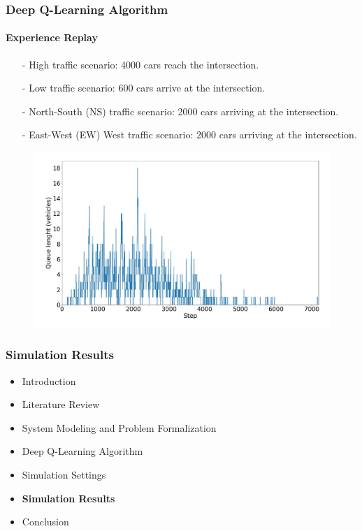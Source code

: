 \documentclass[aspectratio=169]{beamer}
\begin{document}
\begin{frame}
\frametitle{Deep Q-Learning Algorithm}
\framesubtitle{Experience Replay}
\begin{minipage}{0.4\textwidth}
\begin{enumerate}
    \item [-] High traffic scenario: 4000 cars reach the intersection.
    \item [-] Low traffic scenario: 600 cars arrive at the intersection.
    \item [-] North-South (NS) traffic scenario: 2000 cars arriving at the intersection.
    \item [-] East-West (EW) West traffic scenario: 2000 cars arriving at the intersection.
\end{enumerate}

\end{minipage}%
\hfill
\begin{minipage}{0.6\textwidth}
\begin{figure}
    \centering
    \includegraphics[width=1\linewidth]{images/weibull.pdf} 
\end{figure}
\end{minipage}
\end{frame}
\begin{frame}
\frametitle{Simulation Results}
\vspace{1cm}
\begin{itemize}
  \item  Introduction
  \item Literature Review
  \item System Modeling and Problem Formalization
  \item Deep Q-Learning Algorithm
  \item Simulation Settings
  \item {\color{cor1}\textbf{Simulation Results}}
  \item Conclusion
\end{itemize}

\end{frame}
\end{document}
